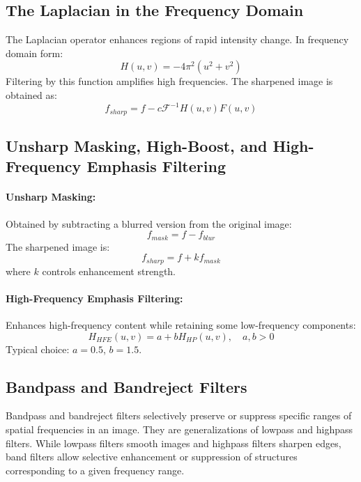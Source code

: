 \documentclass[12pt,a4paper]{AnantDocumentation}
\begin{document}
\subsection{The Laplacian in the Frequency Domain}
The Laplacian operator enhances regions of rapid intensity change. In frequency domain form:
\begin{equation}
H(u,v) = -4\pi^2(u^2 + v^2)
\end{equation}
Filtering by this function amplifies high frequencies. The sharpened image is obtained as:
\begin{equation}
f_{sharp} = f - c \mathcal{F}^{-1}{H(u,v)F(u,v)}
\end{equation}

\subsection{Unsharp Masking, High-Boost, and High-Frequency Emphasis Filtering}
\paragraph{Unsharp Masking:}
Obtained by subtracting a blurred version from the original image:
\begin{equation}
f_{mask} = f - f_{blur}
\end{equation}
The sharpened image is:
\begin{equation}
f_{sharp} = f + k f_{mask}
\end{equation}
where $k$ controls enhancement strength.

\paragraph{High-Frequency Emphasis Filtering:}
Enhances high-frequency content while retaining some low-frequency components:
\begin{equation}
H_{HFE}(u,v) = a + bH_{HP}(u,v), \quad a,b > 0
\end{equation}
Typical choice: $a=0.5$, $b=1.5$.

\subsection{Bandpass and Bandreject Filters}

Bandpass and bandreject filters selectively preserve or suppress specific ranges of spatial frequencies in an image.  
They are generalizations of lowpass and highpass filters. While lowpass filters smooth images and highpass filters sharpen edges, band filters allow selective enhancement or suppression of structures corresponding to a given frequency range.
\end{document}
